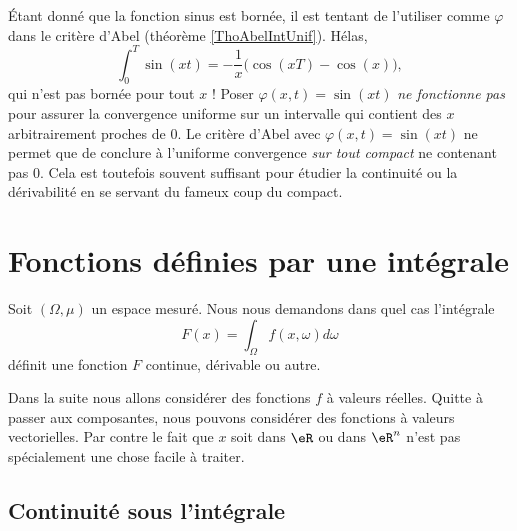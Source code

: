 \begin{remark}
    Étant donné que la fonction sinus est bornée, il est tentant de l'utiliser comme $\varphi$ dans le critère d'Abel (théorème \ref{ThoAbelIntUnif}). Hélas,
    \begin{equation}
        \int_0^T\sin(xt)=-\frac{ 1 }{ x }\big( \cos(xT)-\cos(x) \big),
    \end{equation}
    qui n'est pas bornée pour tout $x$ ! Poser $\varphi(x,t)=\sin(xt)$ \emph{ne fonctionne pas} pour assurer la convergence uniforme sur un intervalle qui contient des $x$ arbitrairement proches de $0$. Le critère d'Abel avec $\varphi(x,t)=\sin(xt)$ ne permet que de conclure à l'uniforme convergence \emph{sur tout compact} ne contenant pas $0$. Cela est toutefois souvent suffisant pour étudier la continuité ou la dérivabilité en se servant du fameux coup du compact.
\end{remark}


\section{Fonctions définies par une intégrale}
\label{SecCHwnBDj}

Soit \( (\Omega,\mu)\) un espace mesuré. Nous nous demandons dans quel cas l'intégrale
\begin{equation}
    F(x)=\int_{\Omega}f(x,\omega)d\omega
\end{equation}
définit une fonction \( F\) continue, dérivable ou autre. 

Dans la suite nous allons considérer des fonctions \( f\) à valeurs réelles. Quitte à passer aux composantes, nous pouvons considérer des fonctions à valeurs vectorielles. Par contre le fait que \( x\) soit dans \( \eR\) ou dans \( \eR^n\) n'est pas spécialement une chose facile à traiter.

\subsection{Continuité sous l'intégrale}

